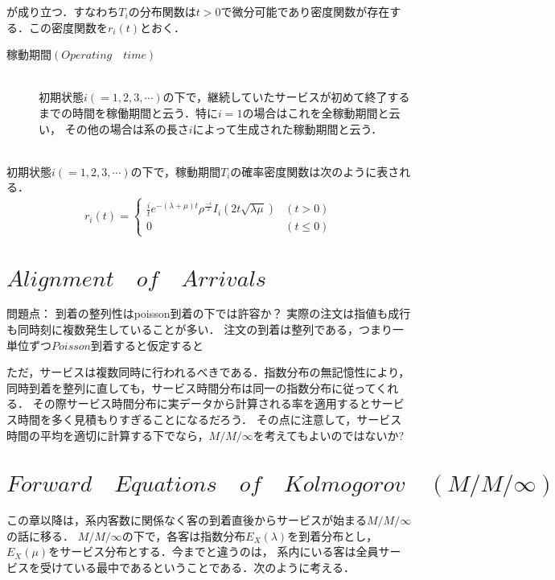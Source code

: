 \documentclass[a4j,papersize,disablejfam,slide,14pt]{jsarticle}
\def\exp#1{e^{#1}} %
\begin{document}
    が成り立つ．すなわち$T_i$の分布関数は$t>0$で微分可能であり密度関数が存在する．この密度関数を$r_i(t)$とおく．
    \begin{screen}
    	\begin{description}
        	\item[稼動期間$(Operating\quad time)$]\mbox{}\\
            	初期状態$i (= 1,2,3,\cdots)$の下で，継続していたサービスが初めて終了するまでの時間を稼働期間と云う．特に$i=1$の場合はこれを全稼動期間と云い，
                その他の場合は系の長さ$i$によって生成された稼動期間と云う．
        \end{description}
        \mbox{}\\
    	初期状態$i (= 1,2,3,\cdots)$の下で，稼動期間$T_i$の確率密度関数は次のように表される．
    	\begin{align}
        	r_i(t) =
            \begin{cases}	
            	\frac{i}{t} \exp{-(\lambda + \mu)t} \rho^{\frac{-i}{2}} I_{i}(2t\sqrt{\lambda \mu}) & (t > 0) \\
                0 & (t \leq 0)
            \end{cases}
        \end{align}
    \end{screen}

\section{$Alignment\quad of\quad Arrivals$}
	問題点：
	到着の整列性はpoisson到着の下では許容か？
    実際の注文は指値も成行も同時刻に複数発生していることが多い．
    注文の到着は整列である，つまり一単位ずつ$Poisson$到着すると仮定すると
    
    ただ，サービスは複数同時に行われるべきである．指数分布の無記憶性により，
    同時到着を整列に直しても，サービス時間分布は同一の指数分布に従ってくれる．
    その際サービス時間分布に実データから計算される率を適用するとサービス時間を多く見積もりすぎることになるだろう．
    その点に注意して，サービス時間の平均を適切に計算する下でなら，$M/M/\infty$を考えてもよいのではないか?

\section{$Forward\quad Equations\quad of\quad Kolmogorov\quad (M/M/\infty)$}
	この章以降は，系内客数に関係なく客の到着直後からサービスが始まる$M/M/\infty$の話に移る．
    $M/M/\infty$の下で，各客は指数分布$E_X(\lambda)$を到着分布とし，$E_X(\mu)$をサービス分布とする．今までと違うのは，
    系内にいる客は全員サービスを受けている最中であるということである．次のように考える．\\
    
\end{document}
